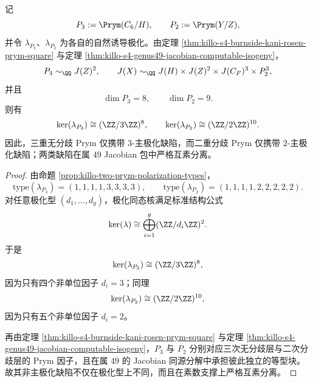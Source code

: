 \begin{theorem}\label{thm:conclusion-hurwitz-prym-kernel-prime-separation}
记
\[
P_3:=\Prym(C_6/H),
\qquad
P_2:=\Prym(Y/Z),
\]
并令 \(\lambda_{P_3}\)、\(\lambda_{P_2}\) 为各自的自然诱导极化。由定理 \ref{thm:killo-s4-burnside-kani-rosen-prym-square} 与定理 \ref{thm:killo-s4-genus49-jacobian-computable-isogeny}，
\[
P_3\sim_{\QQ}J(Z)^2,
\qquad
J(X)\sim_{\QQ}J(H)\times J(Z)^2\times J(C_F)^3\times P_2^3,
\]
并且
\[
\dim P_3=8,
\qquad
\dim P_2=9.
\]
则有
\[
\ker(\lambda_{P_3})\cong (\ZZ/3\ZZ)^8,
\qquad
\ker(\lambda_{P_2})\cong (\ZZ/2\ZZ)^{10}.
\]
因此，三重无分歧 Prym 仅携带 \(3\)-主极化缺陷，而二重分歧 Prym 仅携带 \(2\)-主极化缺陷；两类缺陷在属 \(49\) Jacobian 包中严格互素分离。
\end{theorem}
\begin{proof}
由命题 \ref{prop:killo-two-prym-polarization-types}，
\[
\mathrm{type}(\lambda_{P_3})=(1,1,1,1,3,3,3,3),
\qquad
\mathrm{type}(\lambda_{P_2})=(1,1,1,1,2,2,2,2,2).
\]
对任意极化型 \((d_1,\dots,d_g)\)，极化同态核满足标准结构公式
\[
\ker(\lambda)\cong \bigoplus_{i=1}^{g}(\ZZ/d_i\ZZ)^2.
\]
于是
\[
\ker(\lambda_{P_3})
\cong
(\ZZ/3\ZZ)^8,
\]
因为只有四个非单位因子 \(d_i=3\)；同理
\[
\ker(\lambda_{P_2})
\cong
(\ZZ/2\ZZ)^{10},
\]
因为只有五个非单位因子 \(d_i=2\)。

再由定理 \ref{thm:killo-s4-burnside-kani-rosen-prym-square} 与定理 \ref{thm:killo-s4-genus49-jacobian-computable-isogeny}，\(P_3\) 与 \(P_2\) 分别对应三次无分歧层与二次分歧层的 Prym 因子，且在属 \(49\) 的 Jacobian 同源分解中承担彼此独立的等型块。故其非主极化缺陷不仅在极化型上不同，而且在素数支撑上严格互素分离。
\end{proof}

